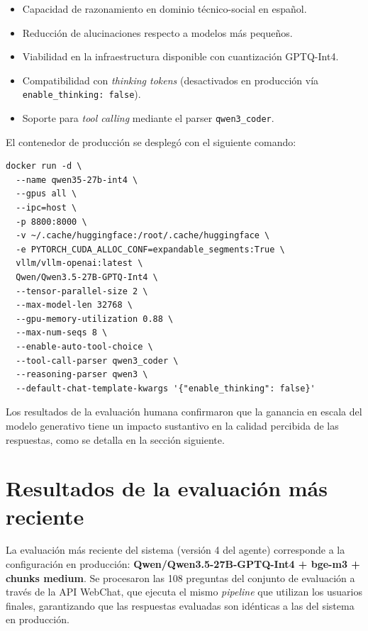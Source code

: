 \begin{itemize}
  \item Capacidad de razonamiento en dominio técnico-social en español.
  \item Reducción de alucinaciones respecto a modelos más pequeños.
  \item Viabilidad en la infraestructura disponible con cuantización GPTQ-Int4.
  \item Compatibilidad con \textit{thinking tokens} (desactivados en producción vía \texttt{enable\_thinking: false}).
  \item Soporte para \textit{tool calling} mediante el parser \texttt{qwen3\_coder}.
\end{itemize}

El contenedor de producción se desplegó con el siguiente comando:

\begin{verbatim}
docker run -d \
  --name qwen35-27b-int4 \
  --gpus all \
  --ipc=host \
  -p 8800:8000 \
  -v ~/.cache/huggingface:/root/.cache/huggingface \
  -e PYTORCH_CUDA_ALLOC_CONF=expandable_segments:True \
  vllm/vllm-openai:latest \
  Qwen/Qwen3.5-27B-GPTQ-Int4 \
  --tensor-parallel-size 2 \
  --max-model-len 32768 \
  --gpu-memory-utilization 0.88 \
  --max-num-seqs 8 \
  --enable-auto-tool-choice \
  --tool-call-parser qwen3_coder \
  --reasoning-parser qwen3 \
  --default-chat-template-kwargs '{"enable_thinking": false}'
\end{verbatim}

Los resultados de la evaluación humana confirmaron que la ganancia en escala del modelo generativo tiene un impacto sustantivo en la calidad percibida de las respuestas, como se detalla en la sección siguiente.

\section{Resultados de la evaluación más reciente}\label{sec:resultados_recientes}

La evaluación más reciente del sistema (versión 4 del agente) corresponde a la configuración en producción: \textbf{Qwen/Qwen3.5-27B-GPTQ-Int4 + bge-m3 + chunks medium}. Se procesaron las 108 preguntas del conjunto de evaluación a través de la API WebChat, que ejecuta el mismo \textit{pipeline} que utilizan los usuarios finales, garantizando que las respuestas evaluadas son idénticas a las del sistema en producción.

